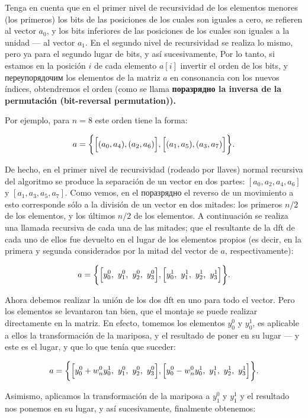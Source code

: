 Tenga en cuenta que en el primer nivel de recursividad de los elementos menores (los primeros) los bits de las posiciones de los cuales son iguales a cero, se refieren al vector $a_0$, y los bits inferiores de las posiciones de los cuales son iguales a la unidad --- al vector $a_1$. En el segundo nivel de recursividad se realiza lo mismo, pero ya para el segundo lugar de bits, y así sucesivamente, Por lo tanto, si estamos en la posición $i$ de cada elemento $a[i]$ invertir el orden de los bits, y переупорядочим los elementos de la matriz $a$ en consonancia con los nuevos índices, obtendremos el orden (como se llama \bf{поразрядно la inversa de la permutación} (bit-reversal permutation)).

Por ejemplo, para $n=8$ este orden tiene la forma:

$$ a = \biggl\{ \Bigl[ (a_0,a_4), (a_2, a_6) \Bigr] , \Bigl[ (a_1, a_5), (a_3, a_7) \Bigr] \biggr\}. $$

De hecho, en el primer nivel de recursividad (rodeado por llaves) normal recursiva del algoritmo se produce la separación de un vector en dos partes: $[a_0,a_2,a_4,a_6]$ y $[a_1,a_3,a_5,a_7]$. Como vemos, en el поразрядно el reverso de un movimiento a esto corresponde sólo a la división de un vector en dos mitades: los primeros $n/2$ de los elementos, y los últimos $n/2$ de los elementos. A continuación se realiza una llamada recursiva de cada una de las mitades; que el resultante de la dft de cada uno de ellos fue devuelto en el lugar de los elementos propios (es decir, en la primera y segunda considerados por la mitad del vector de $a$, respectivamente):

$$ a = \biggl\{ \Bigl[ y_0^0,\ y_1^0,\ y_2^0,\ y_3^0 \Bigr], \Bigl[ y_0^1,\ y_1^1,\ y_2^1,\ y_3^1 \Bigr] \biggr\}. $$

Ahora debemos realizar la unión de los dos dft en uno para todo el vector. Pero los elementos se levantaron tan bien, que el montaje se puede realizar directamente en la matriz. En efecto, tomemos los elementos $y_0^0$ y $y_0^1$, es aplicable a ellos la transformación de la mariposa, y el resultado de poner en su lugar --- y este es el lugar, y que lo que tenía que suceder:

$$ a = \biggl\{ \Bigl[ y_0^0+w_n^0y_0^1,\ y_1^0,\ y_2^0,\ y_3^0 \Bigr], \Bigl[ y_0^0-w_n^0y_0^1,\ y_1^1,\ y_2^1,\ y_3^1 \Bigr] \biggr\}. $$

Asimismo, aplicamos la transformación de la mariposa a $y_1^0$ y $y_1^1$ y el resultado nos ponemos en su lugar, y así sucesivamente, finalmente obtenemos:

